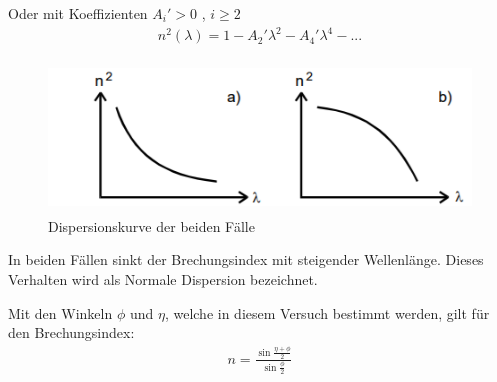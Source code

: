 Oder mit Koeffizienten $A_i' > 0$ , $i \geq 2$
\begin{align}
  {n}^2 (\lambda) = 1 - A_2' \lambda^2 - A_4' \lambda^4 - ...
\end{align}

\begin{figure}[H]
  \centering
  \includegraphics[height=4cm]{dispersion.PNG}
  \caption{Dispersionskurve der beiden Fälle \cite{sample}}
  \label{fig:biegungbild1}
\end{figure}

In beiden Fällen sinkt der Brechungsindex mit steigender Wellenlänge. Dieses Verhalten wird als Normale Dispersion bezeichnet.

Mit den Winkeln $\phi$ und $\eta$, welche in diesem Versuch bestimmt werden, gilt für den Brechungsindex:
\begin{align}
  n = \frac{ \sin{\frac{ \eta + \phi }{2}} }{ \sin{\frac{ \phi }{2}} }
\end{align}
